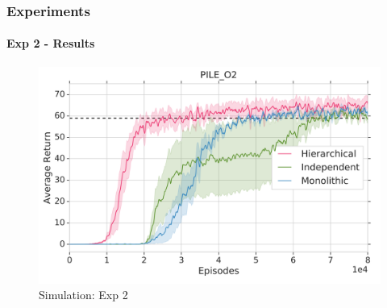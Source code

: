 \documentclass{beamer}
\begin{document}
\begin{frame}
	\frametitle{Experiments}
	\framesubtitle{Exp 2 - Results}
	
	\begin{figure}[!h]
		\caption{Simulation: Exp 2}
		\includegraphics[scale=0.2]{sim-r2.png}
	\end{figure}
\end{frame}
\end{document}
